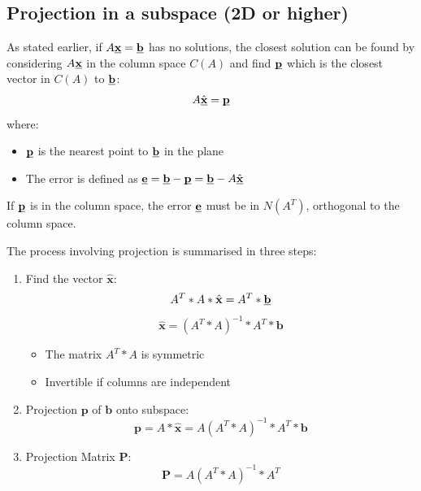 \documentclass[10pt,a4paper]{article}
\begin{document}
\subsection{Projection in a subspace (2D or higher)}

As stated earlier, if $A \textbf{\underbar{x}}=\textbf{\underbar{b}}$ has no solutions, the closest
solution can be found by considering $A \textbf{\underbar{x}}$ in the column space $C(A)$ and
find $\textbf{\underbar{p}}$ which is the closest vector in $C(A)$ to $\textbf{\underbar{b}}$: 
$$
	A \hat{\textbf{\underbar{x}}} = \textbf{\underbar{p}}
$$
where:
\begin{itemize}
	\item $\textbf{\underbar{p}}$ is the nearest point to $\textbf{\underbar{b}}$ in the plane
	\item The error is defined as $\textbf{\underbar{e}}=\textbf{\underbar{b}}-\textbf{\underbar{p}} = \textbf{\underbar{b}}-A \hat{\textbf{\underbar{x}}}$
\end{itemize} 

\begin{tcolorbox}[breakable,colback=white]
If $\textbf{\underbar{p}}$ is in the column space, the error $\textbf{\underbar{e}}$ must be in
$N(A^T)$, orthogonal to the column space.
\end{tcolorbox}
\begin{tcolorbox}[breakable,colback=white]
	The process involving projection is summarised in three steps:
	\begin{enumerate}
		\item Find the vector $\hat{\textbf{x}}$:
		$$A^T*A*\hat{\textbf{x}}=A^T*\textbf{\underbar{b}}$$
		$$\hat{\textbf{x}}=(A^T*A)^{-1}*A^T*\textbf{b}$$
		\begin{itemize}
			\item The matrix $A^T*A$ is symmetric 
			\item Invertible if columns are independent 
		\end{itemize}
		\item Projection $\textbf{p}$ of $\textbf{b}$ onto subspace:
		$$\textbf{p}=A*\hat{\textbf{x}}=A(A^T*A)^{-1}*A^T*\textbf{b}$$
		\item Projection Matrix $\textbf{P}$:
		$$\textbf{P}=A(A^T*A)^{-1}*A^T$$
	\end{enumerate}
\end{tcolorbox}

\end{document}
